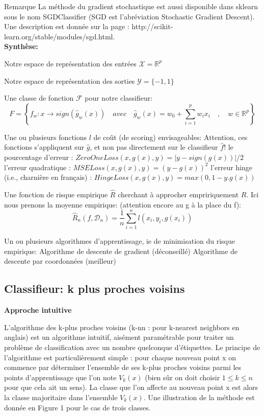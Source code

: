 \documentclass[a4paper]{article}
\theoremstyle{plain}
\begin{document}
Remarque La méthode du gradient stochastique est aussi disponible dans sklearn sous le nom SGDClassifier (SGD est l’abréviation Stochastic Gradient Descent). Une description est donnée sur
la page : http://scikit-learn.org/stable/modules/sgd.html.\\

\textbf{Synthèse:}

\begin{outline}

\1 Notre espace de représentation des entrées $\mathcal{X} = \mathbb{R}^p$

\1 Notre espace de représentation des sorties $\mathcal{Y}=\{-1,1\}$

\1 Une classe de fonction $\mathcal{F}$ pour notre classifieur: $$F = \left\{ f_w : x \rightarrow sign(\hat g_w(x)) \quad avec \quad \hat g_w(x)=w_0 + \sum_{i=1}^{p}w_ix_i \quad, \quad w \in \mathbb{R}^p \right\}$$


\1 Une ou plusieurs fonctions $l$ de coût (de scoring) envisageables:
\2 Attention, ces fonctions s'appliquent sur $\hat g$, et non pas directement sur le classifieur $\hat f$!
\2 le pourcentage d’erreur : $ZeroOneLoss(x, g(x),y) = |y-sign(g(x))|/2$
\2 l’erreur quadratique : $MSELoss(x,g(x),y) = (y -g(x))^2$
\2 l’erreur hinge (i.e., charnière en français) : $HingeLoss(x,g(x),y) = max(0,1-y.g(x))$

\1 Une fonction de risque empirique $\hat R$ cherchant à approcher empririquement $R$. Ici nous prenons la moyenne empirique: (attention encore au g à la place du f):
$$\hat R_n(f, \mathcal{D}_n) = \frac{1}{n}\sum_{i=1}^{n}\mathit{l}(x_i,y_i,g(x_i))$$

\1 Un ou plusieurs algorithmes d'apprentissage, ie de minimisation du risque empirique:
\2 Algorithme de descente de gradient (déconseillé)
\2 Algorithme de descente par coordonnées (meilleur)

\end{outline}

\pagebreak
\subsection{Classifieur: k plus proches voisins}
\textbf{Approche intuitive}

L’algorithme des k-plus proches voisins (k-nn : pour k-nearest neighbors en anglais) est un algorithme
intuitif, aisément paramétrable pour traiter un problème de classification avec un nombre quelconque
d’étiquettes.
Le principe de l’algorithme est particulièrement simple : pour chaque nouveau point x on commence
par déterminer l’ensemble de ses k-plus proches voisins parmi les points d’apprentissage que l’on note
$V_k(x)$ (bien sûr on doit choisir $1 \leq k \leq n$ pour que cela ait un sens). La classe que l’on affecte au nouveau point x est alors la classe majoritaire dans l’ensemble $V_k(x)$. Une illustration de la méthode est donnée en Figure 1 pour le cas de trois classes.
\end{document}
